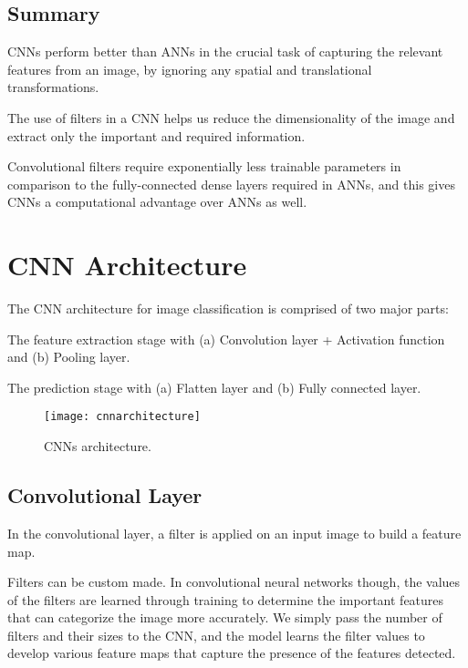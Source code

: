 	\subsection{Summary}
	\begin{bulletedlist}
		\item CNNs perform better than ANNs in the crucial task of capturing the relevant features from an image, by ignoring any spatial and translational transformations.
		\item The use of filters in a CNN helps us reduce the dimensionality of the image and extract only the important and required information.
		\item Convolutional filters require exponentially less trainable parameters in comparison to the fully-connected dense layers required in ANNs, and this gives CNNs a computational advantage over ANNs as well.
	\end{bulletedlist}

	\section{CNN Architecture}
	\begin{bulletedlist}
		\item The CNN architecture for image classification is comprised of two major parts:
		\begin{numberedlist}
			\item The feature extraction stage with (a) Convolution layer + Activation function and (b) Pooling layer.
			\item The prediction stage with (a) Flatten layer and (b) Fully connected layer.
		\end{numberedlist}
	\end{bulletedlist}

	\begin{figure}[tbh]
		\centering
		\texttt{[image: cnnarchitecture]}
		\caption[CNNs architecture]{CNNs architecture.}
		\label{fig:cnnarchitecture}
	\end{figure}


	\subsection{Convolutional Layer}
	\begin{bulletedlist}
		\item In the convolutional layer, a filter is applied on an input image to build a feature map.
		\item Filters can be custom made.  In convolutional neural networks though, the values of the filters are learned through training to determine the important features that can categorize the image more accurately. We simply pass the number of filters and their sizes to the CNN, and the model learns the filter values to develop various feature maps that capture the presence of the features detected.
	\end{bulletedlist}

